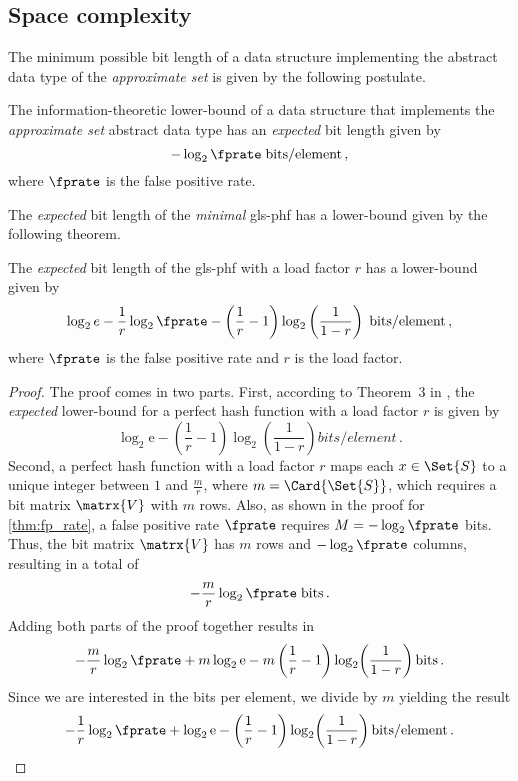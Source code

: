 \documentclass[ ../main.tex]{subfiles}
\begin{document}
\subsection{Space complexity}
The minimum possible bit length of a data structure implementing the abstract data type of the \emph{approximate set} is given by the following postulate.
\begin{postulate}
\label{pst:approx_l_b}
The information-theoretic lower-bound of a data structure that implements the \emph{approximate set} abstract data type has an \emph{expected} bit length given by
\begin{equation}
    -\log_2 \fprate \; \si{bits \per element}\,,
\end{equation}
where $\fprate$ is the false positive rate.
\end{postulate}

The \emph{expected} bit length of the \emph{minimal} \gls{gls-phf} has a lower-bound given by the following theorem.
\begin{theorem}
\label{thm:mPHF_size}
The \emph{expected} bit length of the \gls{gls-phf} with a load factor $r$ has a lower-bound given by
\begin{equation}
\label{eq:mPHF_size}
    \log_2 e - \frac{1}{r} \log_2 \fprate - \left(\frac{1}{r} - 1\right) \log_2\left(\frac{1}{1-r}\right)\; \si{bits \per element}\,,
\end{equation}
where $\fprate$ is the false positive rate and $r$ is the load factor.
\end{theorem}
\begin{proof}
The proof comes in two parts. First, according to Theorem~3 in \cite{oph}, the \emph{expected} lower-bound for a perfect hash function with a load factor $r$ is given by
\begin{equation}
    \log_2 \mathrm{e} - \left(\frac{1}{r} - 1\right) \log_2\!\left(\frac{1}{1-r}\right) \si{bits \per element}\,.
\end{equation}
Second, a perfect hash function with a load factor $r$ maps each $x \in \Set{S}$ to a unique integer between $1$ and $\frac{m}{r}$, where $m=\Card{\Set{S}}$, which requires a bit matrix $\matrx{V}$ with $m$ rows. Also, as shown in the proof for \cref{thm:fp_rate}, a false positive rate $\fprate$ requires $M = -\log_2 \fprate$ bits. Thus, the bit matrix $\matrx{V}$ has $m$ rows and $-\log_2 \fprate$ columns, resulting in a total of
\begin{equation}
    -\frac{m}{r} \log_2 \fprate \; \si{bits}\,.
\end{equation}
Adding both parts of the proof together results in
\begin{equation}
    -\frac{m}{r} \log_2 \fprate + m \log_2 \mathrm{e} - m \left(\frac{1}{r} - 1\right) \log_2\!\left(\frac{1}{1-r}\right) \si{bits}\,.
\end{equation}
Since we are interested in the bits per element, we divide by $m$ yielding the result
\begin{equation}
    -\frac{1}{r} \log_2 \fprate + \log_2 \mathrm{e} -  \left(\frac{1}{r} - 1\right) \log_2\!\left(\frac{1}{1-r}\right) \si{bits \per element}\,.
\end{equation}
\end{proof}
\end{document}
